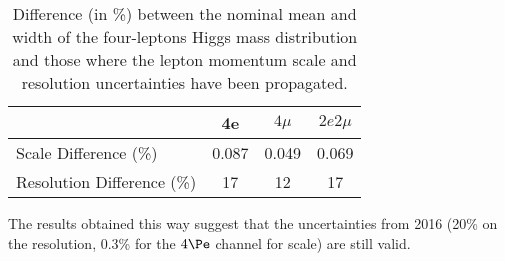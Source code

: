 \begin{table}[h]
   \centering
    \caption{
    Difference (in \%) between the nominal mean and width of the four-leptons Higgs mass distribution and those where the lepton momentum scale and resolution uncertainties have been propagated.
    }
    \begin{tabular}{| l | c | c | c |} \hline
                & 4e         & $4\mu$                      & $2e2\mu$       \\ 
\hline \hline
Scale Difference (\%) & 0.087 & 0.049 & 0.069 \\
Resolution Difference (\%) & 17 & 12 & 17 \\
\hline
 \end{tabular}
    \label{tab:leptonscalereso}
\end{table}


The results obtained this way suggest that the uncertainties from 2016 (20\% on the resolution, 0.3\% for the $4\Pe$ channel for scale) are still valid. 



